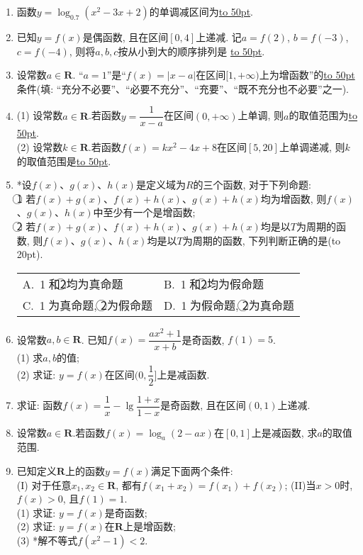 \documentclass[10pt,a4paper]{article}
\newcommand{\blank}[1]{\underline{\hbox to #1pt{}}}
\newcommand{\bracket}[1]{(\hbox to #1pt{})}
\newcommand{\twoch}[4]{\par\begin{tabular}{p{.46\textwidth}p{.46\textwidth}}
A.~#1& B.~#2\\
C.~#3& D.~#4
\end{tabular}}
\begin{document}
\begin{enumerate}[1.]
\item 函数$y=\log_{0.7}(x^2-3x+2)$的单调减区间为\blank{50}.
\item 已知$y=f(x)$是偶函数, 且在区间$[0,4]$上递减. 记$a=f(2)$, $b=f(-3)$, $c=f(-4)$, 则将$a,b,c$按从小到大的顺序排列是	\blank{50}.	
\item 设常数$a\in \mathbf{R}$. ``$a=1$''是``$f(x)=|x-a|$在区间$[1, +\infty)$上为增函数''的\blank{50}条件(填: ``充分不必要''、``必要不充分''、``充要''、``既不充分也不必要''之一).
\item (1) 设常数$a\in \mathbf{R}$.若函数$y=\dfrac 1{x-a}$在区间$(0,+\infty)$上单调, 则$a$的取值范围为\blank{50}.\\
(2) 设常数$k\in \mathbf{R}$.若函数$f(x)=kx^2-4x+8$在区间$[5,20]$上单调递减, 则$k$的取值范围是\blank{50}.
\item  *设$f(x)$、$g(x)$、$h(x)$是定义域为$R$的三个函数, 对于下列命题:\\
\textcircled{1} 若$f(x)+g(x)$、$f(x)+h(x)$、$g(x)+h(x)$均为增函数, 则$f(x)$、$g(x)$、$h(x)$中至少有一个是增函数;\\
\textcircled{2} 若$f(x)+g(x)$、$f(x)+h(x)$、$g(x)+h(x)$均是以$T$为周期的函数, 则$f(x)$、$g(x)$、$h(x)$均是以$T$为周期的函数, 下列判断正确的是\bracket{20}.
\twoch{\textcircled{1}和\textcircled{2}均为真命题}{\textcircled{1}和\textcircled{2}均为假命题}{\textcircled{1}为真命题, \textcircled{2}为假命题}{\textcircled{1}为假命题, \textcircled{2}为真命题}
\item 设常数$a,b\in \mathbf{R}$. 已知$f(x)=\dfrac{ax^2+1}{x+b}$是奇函数, $f(1)=5$.\\
(1) 求$a,b$的值;\\
(2) 求证: $y=f(x)$在区间$(0,\dfrac 12]$上是减函数.
\item 求证: 函数$f(x)=\dfrac 1x-\lg\dfrac{1+x}{1-x}$是奇函数, 且在区间$(0,1)$上递减.
\item 设常数$a\in \mathbf{R}$.若函数$f(x)=\log_a(2-ax)$在$[0,1]$上是减函数, 求$a$的取值范围.
\item 已知定义$\mathbf{R}$上的函数$y=f(x)$满足下面两个条件:\\
(I) 对于任意$x_1,x_2\in \mathbf{R}$, 都有$f(x_1+x_2)=f(x_1)+f(x_2)$; (II)当$x>0$时, $f(x)>0$, 且$f(1)=1$.\\
(1) 求证: $y=f(x)$是奇函数;\\
(2) 求证: $y=f(x)$在$\mathbf{R}$上是增函数;\\
(3) *解不等式$f(x^2-1)<2$.


\end{enumerate}
\end{document}
